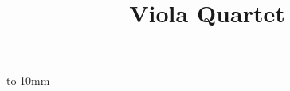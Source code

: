 \documentclass{article}         %
\begin{document}


\def\interstaffline{\vskip1mm}
\def\interscoreline{\vskip2mm}
\vbox to 10mm{\vss}
\title{Viola Quartet}
\instrument{}
\maketit

\end{document}

